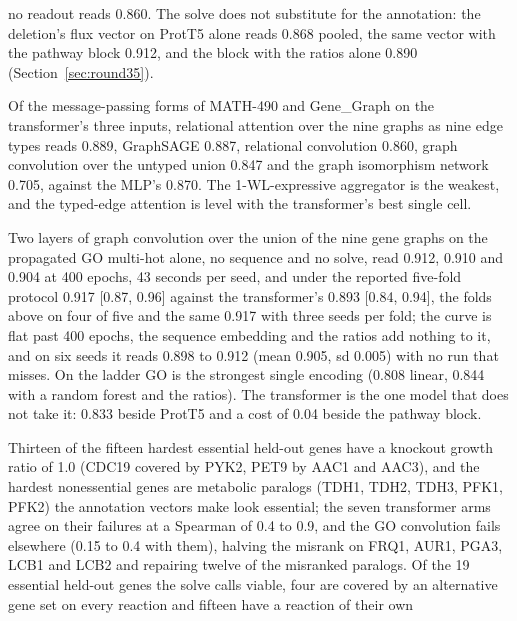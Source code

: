 \begin{description}
    no readout reads 0.860. The solve does not substitute for the annotation: the
    deletion's flux vector on ProtT5 alone reads 0.868 pooled, the same vector with
    the pathway block 0.912, and the block with the ratios alone 0.890
    (Section~\ref{sec:round35}).
  \item[Keeping the edge type is the one architectural choice that registers.] Of the
    message-passing forms of MATH-490 and Gene\_Graph on the transformer's three inputs,
    relational attention over the nine graphs as nine edge types reads 0.889, GraphSAGE
    0.887, relational convolution 0.860, graph convolution over the untyped union 0.847
    and the graph isomorphism network 0.705, against the MLP's 0.870. The 1-WL-expressive
    aggregator is the weakest, and the typed-edge attention is level with the
    transformer's best single cell.
  \item[GO through the graph is the highest number in the document.] Two layers of
    graph convolution over the union of the nine gene graphs on the propagated GO
    multi-hot alone, no sequence and no solve, read 0.912, 0.910 and 0.904 at 400
    epochs, 43 seconds per seed, and under the reported five-fold protocol 0.917
    [0.87, 0.96] against the transformer's 0.893 [0.84, 0.94], the folds above on four
    of five and the same 0.917 with three seeds per fold; the curve is flat past 400
    epochs, the sequence embedding and the
    ratios add nothing to it, and on six seeds it reads 0.898 to 0.912 (mean 0.905,
    sd 0.005) with no run that misses. On the ladder GO is
    the strongest single encoding (0.808 linear, 0.844 with a random forest and the
    ratios). The transformer is the one model that does not take it: 0.833 beside
    ProtT5 and a cost of 0.04 beside the pathway block.
  \item[The genes every model misses are the ones the solve misses.] Thirteen of the
    fifteen hardest essential held-out genes have a knockout growth ratio of 1.0 (CDC19
    covered by PYK2, PET9 by AAC1 and AAC3), and the hardest nonessential genes are
    metabolic paralogs (TDH1, TDH2, TDH3, PFK1, PFK2) the annotation vectors make look
    essential; the seven transformer arms agree on their failures at a Spearman of 0.4
    to 0.9, and the GO convolution fails elsewhere (0.15 to 0.4 with them), halving the
    misrank on
    FRQ1, AUR1, PGA3, LCB1 and LCB2 and repairing twelve of the misranked paralogs.
    Of the 19 essential held-out genes the solve calls viable, four are covered by an
    alternative gene set on every reaction and fifteen have a reaction of their own

\end{description}
